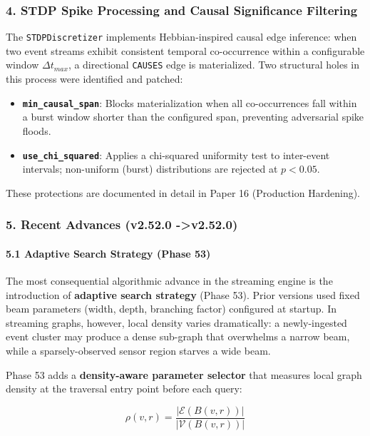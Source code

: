 \subsubsection{4. STDP Spike Processing and Causal Signif\-icance Filtering}
The \texttt{STDPDiscretizer} implements Hebbian-inspired causal edge inference: when two event streams exhibit consistent temporal co-occurrence within a confi\-gurable window $\Delta t_{max}$, a directional \texttt{CAUSES} edge is mater\-ialized. Two structural holes in this process were identified and patched:

\begin{itemize}
\item \textbf{\texttt{min\_causal\_span}}: Blocks mater\-ialization when all co-occurrences fall within a burst window shorter than the configured span, preventing adversarial spike floods.
\item \textbf{\texttt{use\_chi\_squared}}: Applies a chi-squared uniformity test to inter-event intervals; non-uniform (burst) distr\-ibutions are rejected at $p < 0.05$.

\end{itemize}
These protections are documented in detail in Paper 16 (Production Hardening).

\subsubsection{5. Recent Advances (v2.52.0 -\textgreater  v2.52.0)}

\paragraph{5.1 Adaptive Search Strategy (Phase 53)}
The most conse\-quential algorithmic advance in the streaming engine is the intro\-duction of \textbf{adaptive search strategy} (Phase 53). Prior versions used fixed beam parameters (width, depth, branching factor) configured at startup. In streaming graphs, however, local density varies drama\-tically: a newly-ingested event cluster may produce a dense sub-graph that overwhelms a narrow beam, while a sparsely-observed sensor region starves a wide beam.

Phase 53 adds a \textbf{density-aware parameter selector} that measures local graph density at the traversal entry point before each query:

\begin{equation}
\rho(v, r) = \frac{|\mathcal{E}(B(v,r))|}{|\mathcal{V}(B(v,r))|}
\end{equation}

